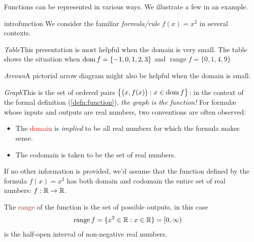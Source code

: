 
Functions can be represented in various ways. We illustrate a few in an example.

\begin{example}{}{introfunction}
	We consider the familiar \emph{formula/rule} $f(x)=x^2$ in several contexts.
	\begin{description}\itemsep8pt
	  \begin{minipage}[t]{0.71\linewidth}\vspace{-5pt}
	  	\item \emph{Table}\lstsp This presentation is most helpful when the domain is very small. The table shows the situation when $\operatorname{dom} f=\{-1,0,1,2,3\}$ and $\operatorname{range}f=\{0,1,4,9\}$
	  
	  	\item \emph{Arrows}\lstsp A pictorial arrow diagram might also be helpful when the domain is small.
	  
	  	\item \emph{Graph}\lstsp This is the set of ordered pairs $\bigl\{\bigl(x,f(x)\bigr):x\in\operatorname{dom} f\bigr\}$: in the context of the formal definition (\ref{defn:function}), \emph{the graph is the function!}\smallbreak
		 	For formulæ whose inputs and outputs are real numbers, two conventions are often observed:
		 	\begin{itemize}
		 	  \item The \textcolor{red}{domain} is \emph{implied} to be all real numbers for which the formula makes sense.
				\item The codomain is taken to be the set of real numbers.
			\end{itemize}
			If no other information is provided, we'd assume that the function defined by the formula $f(x)=x^2$ has both domain and codomain the entire set of real numbers: $f:\mathbb{R}\to\mathbb{R}$.
			\smallbreak
			
			The \textcolor{Brown}{range} of the function is the set of possible outputs, in this case
			\[
				\operatorname{range}f=\{x^2\in\mathbb{R}:x\in\mathbb{R}\}=[0,\infty)
			\]
			is the half-open interval of non-negative real numbers.
			\smallbreak
			

\end{minipage}
\end{description}
\end{example}
